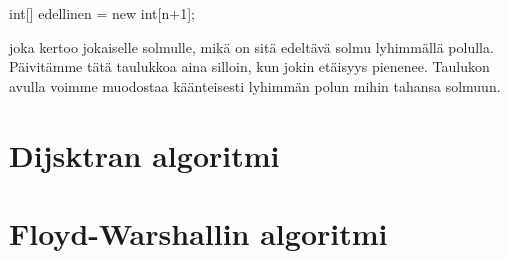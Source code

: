 \begin{code}
int[] edellinen = new int[n+1];
\end{code}

joka kertoo jokaiselle solmulle, mikä on sitä edeltävä
solmu lyhimmällä polulla.
Päivitämme tätä taulukkoa aina silloin,
kun jokin etäisyys pienenee.
Taulukon avulla voimme muodostaa käänteisesti
lyhimmän polun mihin tahansa solmuun.

\section{Dijsktran algoritmi}

\section{Floyd-Warshallin algoritmi}
